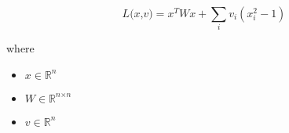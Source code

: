 \documentclass[12pt]{article}
\begin{document}
\[
\textit{L(x,v)} = \textit{x}^T\textit{W}\textit{x} + \sum_\textit{i} \textit{v}_{ \textit{i} }(\textit{x}_{ \textit{i} }^{2} - 1)
\]

where
\begin{itemize}
\item $\textit{x} \in \mathbb{R}^{ \textit{n}}$
\item $\textit{W} \in \mathbb{R}^{ \textit{n} \times \textit{n} }$
\item $\textit{v} \in \mathbb{R}^{ \textit{n}}$
\end{itemize}
\end{document}
